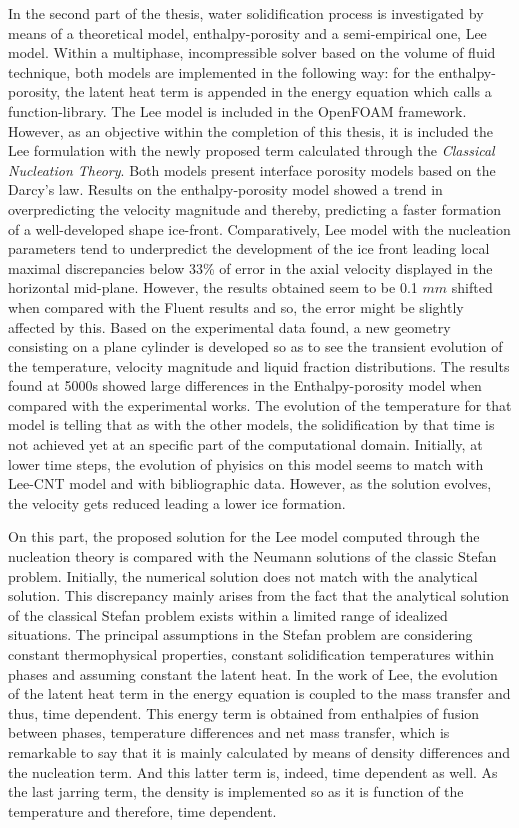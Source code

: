 \noindent In the second part of the thesis, water solidification process is investigated by means of a theoretical model, enthalpy-porosity and a semi-empirical one, Lee model. Within a multiphase, incompressible solver based on the volume of fluid technique, both models are implemented in the following way: for the enthalpy-porosity, the latent heat term is appended in the energy equation which calls a function-library. The Lee model is included in the OpenFOAM framework. However, as an objective within the completion of this thesis, it is included the Lee formulation with the newly proposed term calculated through the \textit{Classical Nucleation Theory}. Both models present interface porosity models based on the Darcy's law. Results on the enthalpy-porosity model showed a trend in overpredicting the velocity magnitude and thereby, predicting a faster formation of a well-developed shape ice-front. Comparatively, Lee model with the nucleation parameters tend to underpredict the development of the ice front leading local maximal discrepancies below 33\% of error in the axial velocity displayed in the horizontal mid-plane. However, the results obtained seem to be 0.1 $mm$ shifted when compared with the Fluent results and so, the error might be slightly affected by this. Based on the experimental data found, a new geometry consisting on a plane cylinder is developed so as to see the transient evolution of the temperature, velocity magnitude and liquid fraction distributions. The results found at 5000s showed large differences in the Enthalpy-porosity model when compared with the experimental works. The evolution of the temperature for that model is telling that as with the other models, the solidification by that time is not achieved yet at an specific part of the computational domain. Initially, at lower time steps, the evolution of phyisics on this model seems to match with Lee-CNT model and with bibliographic data. However, as the solution evolves, the velocity gets reduced leading a lower ice formation.

\noindent On this part, the proposed solution for the Lee model computed through the nucleation theory is compared with the Neumann solutions of the classic Stefan problem. Initially, the numerical solution does not match with the analytical solution. This discrepancy mainly arises from the fact that the analytical solution of the classical Stefan problem exists within a limited range of idealized situations. The principal assumptions in the Stefan problem are considering constant thermophysical properties, constant solidification temperatures within phases and assuming constant the latent heat. In the work of Lee, the evolution of the latent heat term in the energy equation is coupled to the mass transfer and thus, time dependent. This energy term is obtained from enthalpies of fusion between phases, temperature differences and net mass transfer, which is remarkable to say that it is mainly calculated by means of density differences and the nucleation term. And this latter term is, indeed, time dependent as well. As the last jarring term, the density is implemented so as it is function of the temperature and therefore, time dependent.

